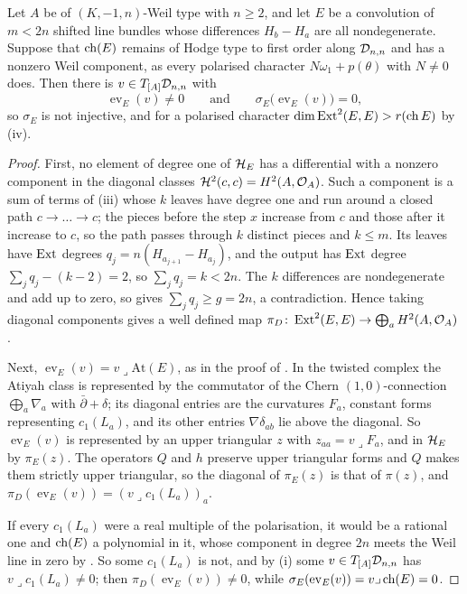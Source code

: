 \begin{theorem}\label{thm:fewpieces}
Let $A$ be of $(K,-1,n)$-Weil type with $n\ge2$, and let $E$ be a
convolution of $m<2n$ shifted line bundles whose differences $H_{b}-H_{a}$
are all nondegenerate. Suppose that $\operatorname{ch}(E)$ remains of Hodge type to first
order along $\mathcal{D}_{n,n}$ and has a nonzero Weil component, as every polarised
character $N\omega_{1}+p(\theta)$ with $N\ne0$ does. Then there is
$v\in T_{[A]}\mathcal{D}_{n,n}$ with
\[
  \operatorname{ev}_{E}(v)\ne0
  \qquad\text{and}\qquad
  \sigma_{E}\bigl(\operatorname{ev}_{E}(v)\bigr)=0 ,
\]
so $\sigma_{E}$ is not injective, and for a polarised character
$\dim\operatorname{Ext}^{2}(E,E)>r(\operatorname{ch} E)$ by (iv).
\end{theorem}

\begin{proof}
First, no element of degree one of $\mathcal{H}_{E}$ has a differential with a
nonzero component in the diagonal classes $\mathcal{H}^{2}(c,c)=H^{2}(A,\mathcal{O}_{A})$.
Such a component is a sum of terms of (iii) whose
$k$ leaves have degree one and run around a closed path $c\to\dots\to c$; the
pieces before the step $x$ increase from $c$ and those after it increase to
$c$, so the path passes through $k$ distinct pieces and $k\le m$. Its
leaves have $\operatorname{Ext}$ degrees $q_{j}=n(H_{a_{j+1}}-H_{a_{j}})$, and the output
has $\operatorname{Ext}$ degree $\sum_{j}q_{j}-(k-2)=2$, so $\sum_{j}q_{j}=k<2n$. The $k$
differences are nondegenerate and add up to zero, so 
gives $\sum_{j}q_{j}\ge g=2n$, a contradiction. Hence taking diagonal
components gives a well defined map
$\pi_{D}\colon\operatorname{Ext}^{2}(E,E)\to\bigoplus_{a}H^{2}(A,\mathcal{O}_{A})$.

Next, $\operatorname{ev}_{E}(v)=v\lrcorner\mathrm{At}(E)$, as in the proof
of . In the twisted complex the Atiyah class is
represented by the commutator of the Chern $(1,0)$-connection
$\bigoplus_{a}\nabla_{a}$ with $\bar\partial+\delta$; its diagonal entries
are the curvatures $F_{a}$, constant forms representing $c_{1}(L_{a})$, and
its other entries $\nabla\delta_{ab}$ lie above the diagonal. So
$\operatorname{ev}_{E}(v)$ is represented by an upper triangular $z$ with
$z_{aa}=v\lrcorner F_{a}$, and in $\mathcal{H}_{E}$ by $\pi_{E}(z)$. The operators
$Q$ and $h$ preserve upper triangular forms and $Q$ makes them strictly upper
triangular, so the diagonal of $\pi_{E}(z)$ is that of $\pi(z)$, and
$\pi_{D}(\operatorname{ev}_{E}(v))=(v\lrcorner c_{1}(L_{a}))_{a}$.

If every $c_{1}(L_{a})$ were a real multiple of the polarisation, it would
be a rational one and $\operatorname{ch}(E)$ a polynomial in it, whose component in degree
$2n$ meets the Weil line in zero by . So some
$c_{1}(L_{a})$ is not, and by (i) some
$v\in T_{[A]}\mathcal{D}_{n,n}$ has $v\lrcorner c_{1}(L_{a})\ne0$; then
$\pi_{D}(\operatorname{ev}_{E}(v))\ne0$, while
$\sigma_{E}(\operatorname{ev}_{E}(v))=v\lrcorner\operatorname{ch}(E)=0$.
\end{proof}

